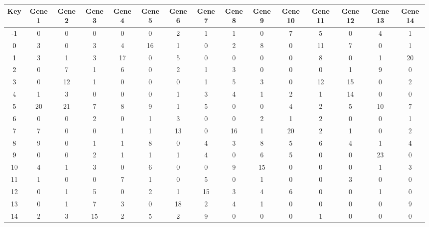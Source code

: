 \begin{tabular}{|c|c|c|c|c|c|c|c|c|c|c|c|c|c|c|}
\hline
Key & Gene 1 & Gene 2 & Gene 3 & Gene 4 & Gene 5 & Gene 6 & Gene 7 & Gene 8 & Gene 9 & Gene 10 & Gene 11 & Gene 12 & Gene 13 & Gene 14 \\
\hline
-1 & 0 & 0 & 0 & 0 & 0 & 2 & 1 & 1 & 0 & 7 & 5 & 0 & 4 & 1 \\
0 & 3 & 0 & 3 & 4 & 16 & 1 & 0 & 2 & 8 & 0 & 11 & 7 & 0 & 1 \\
1 & 3 & 1 & 3 & 17 & 0 & 5 & 0 & 0 & 0 & 0 & 8 & 0 & 1 & 20 \\
2 & 0 & 7 & 1 & 6 & 0 & 2 & 1 & 3 & 0 & 0 & 0 & 1 & 9 & 0 \\
3 & 0 & 12 & 1 & 0 & 0 & 0 & 1 & 5 & 3 & 0 & 12 & 15 & 0 & 2 \\
4 & 1 & 3 & 0 & 0 & 0 & 1 & 3 & 4 & 1 & 2 & 1 & 14 & 0 & 0 \\
5 & 20 & 21 & 7 & 8 & 9 & 1 & 5 & 0 & 0 & 4 & 2 & 5 & 10 & 7 \\
6 & 0 & 0 & 2 & 0 & 1 & 3 & 0 & 0 & 2 & 1 & 2 & 0 & 0 & 1 \\
7 & 7 & 0 & 0 & 1 & 1 & 13 & 0 & 16 & 1 & 20 & 2 & 1 & 0 & 2 \\
8 & 9 & 0 & 1 & 1 & 8 & 0 & 4 & 3 & 8 & 5 & 6 & 4 & 1 & 4 \\
9 & 0 & 0 & 2 & 1 & 1 & 1 & 4 & 0 & 6 & 5 & 0 & 0 & 23 & 0 \\
10 & 4 & 1 & 3 & 0 & 6 & 0 & 0 & 9 & 15 & 0 & 0 & 0 & 1 & 3 \\
11 & 1 & 0 & 0 & 7 & 1 & 0 & 5 & 0 & 1 & 0 & 0 & 3 & 0 & 0 \\
12 & 0 & 1 & 5 & 0 & 2 & 1 & 15 & 3 & 4 & 6 & 0 & 0 & 1 & 0 \\
13 & 0 & 1 & 7 & 3 & 0 & 18 & 2 & 4 & 1 & 0 & 0 & 0 & 0 & 9 \\
14 & 2 & 3 & 15 & 2 & 5 & 2 & 9 & 0 & 0 & 0 & 1 & 0 & 0 & 0 \\
\hline
\end{tabular}